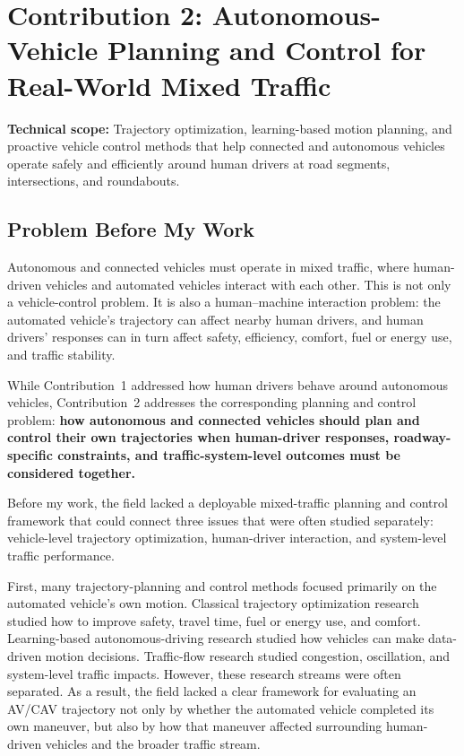 \documentclass[11pt,letterpaper]{article}
\begin{document}
\section{Contribution 2: Autonomous-Vehicle Planning and Control for Real-World Mixed Traffic}

\textbf{Technical scope:} Trajectory optimization, learning-based motion planning, and proactive vehicle control methods that help connected and autonomous vehicles operate safely and efficiently around human drivers at road segments, intersections, and roundabouts.

\subsection{Problem Before My Work}

Autonomous and connected vehicles must operate in mixed traffic, where human-driven vehicles and automated vehicles interact with each other. This is not only a vehicle-control problem. It is also a human--machine interaction problem: the automated vehicle's trajectory can affect nearby human drivers, and human drivers' responses can in turn affect safety, efficiency, comfort, fuel or energy use, and traffic stability.

While Contribution~1 addressed how human drivers behave around autonomous vehicles, Contribution~2 addresses the corresponding planning and control problem: \textbf{how autonomous and connected vehicles should plan and control their own trajectories when human-driver responses, roadway-specific constraints, and traffic-system-level outcomes must be considered together.}

Before my work, the field lacked a deployable mixed-traffic planning and control framework that could connect three issues that were often studied separately: vehicle-level trajectory optimization, human-driver interaction, and system-level traffic performance.

First, many trajectory-planning and control methods focused primarily on the automated vehicle's own motion. Classical trajectory optimization research studied how to improve safety, travel time, fuel or energy use, and comfort. Learning-based autonomous-driving research studied how vehicles can make data-driven motion decisions. Traffic-flow research studied congestion, oscillation, and system-level traffic impacts. However, these research streams were often separated. As a result, the field lacked a clear framework for evaluating an AV/CAV trajectory not only by whether the automated vehicle completed its own maneuver, but also by how that maneuver affected surrounding human-driven vehicles and the broader traffic stream.
\end{document}
